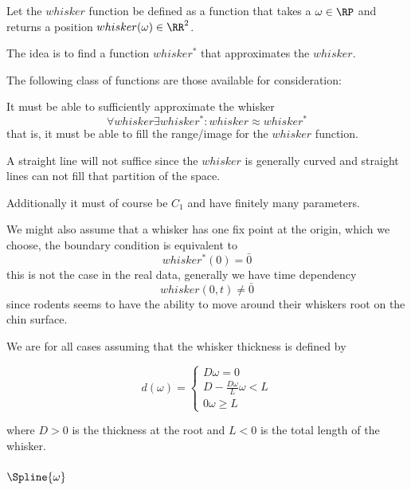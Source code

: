 
\begin{definition}
Let the $whisker$ function be defined as a function that takes a $\omega\in\RP$
and returns a position $whisker(\omega)\in\RR^2$.
\end{definition}

The idea is to find a function $whisker^*$ that approximates the $whisker$.

The following class of functions are those available for consideration:

It must be able to sufficiently approximate the whisker
\begin{equation}
    \forall whisker \exists whisker^* : whisker \approx whisker^*
\end{equation}
that is, it must be able to fill the range/image for the $whisker$ function.

\begin{example}
A straight line will not suffice since the $whisker$ is generally
curved and straight lines can not fill that partition of the space.
\end{example}

Additionally it must of course be $C_1$ and have finitely many parameters.

We might also assume that a whisker has one fix point at the origin, which we choose, the boundary 
condition is equivalent to
\begin{equation}
    \label{eq:bv_root}
    whisker^*(0)=\bar{0}
\end{equation}
this is not the case in the real data, 
generally we have time dependency
\begin{equation}
    whisker(0,t)\neq\bar{0} 
\end{equation}
since rodents seems to have the ability to move around their whiskers root on the chin surface.

We are for all cases assuming that the whisker thickness is defined by

\begin{equation}
    d(\omega) = \begin{cases}
        D \omega=0\\
        D-\frac{D\omega}{L} \omega<L\\
        0 \omega\ge L
    \end{cases}
\end{equation}

where $D>0$ is the thickness at the root and $L<0$ is the total length of the
whisker.

\subsubsection{$\Spline{\omega}$}

